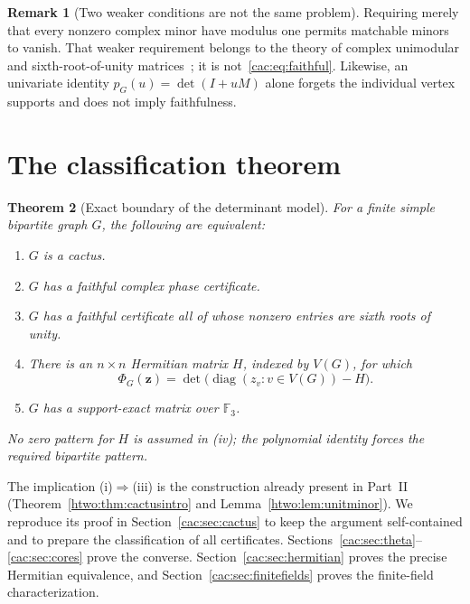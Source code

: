 \documentclass[11pt]{article}
\numberwithin{equation}{section}
\newtheorem{theorem}{Theorem}[section]
\theoremstyle{definition}
\newtheorem{remark}[theorem]{Remark}
\newcommand{\diag}{\operatorname{diag}}
\newcommand{\F}{\mathbb F}
\newcommand{\zv}{\mathbf z}
\begin{document}
\begin{remark}[Two weaker conditions are not the same problem]
Requiring merely that every nonzero complex minor have modulus one permits matchable minors to vanish. That weaker requirement belongs to the theory of complex unimodular and sixth-root-of-unity matrices~\cite{BDZ}; it is not~\eqref{cac:eq:faithful}. Likewise, an univariate identity $p_G(u)=\det(I+uM)$ alone forgets the individual vertex supports and does not imply faithfulness.
\end{remark}

\section{The classification theorem}
\label{cac:sec:main}

\begin{theorem}[Exact boundary of the determinant model]
\label{cac:thm:classification}
For a finite simple bipartite graph $G$, the following are equivalent:
\begin{enumerate}[label=(\roman*)]
\item $G$ is a cactus.
\item $G$ has a faithful complex phase certificate.
\item $G$ has a faithful certificate all of whose nonzero entries are sixth roots of unity.
\item There is an $n\times n$ Hermitian matrix $H$, indexed by $V(G)$, for which
\begin{equation}
 \Phi_G(\zv)=\det\bigl(\diag(z_v:v\in V(G))-H\bigr).
 \label{cac:eq:vertexdet}
\end{equation}
\item $G$ has a support-exact matrix over $\F_3$.
\end{enumerate}
No zero pattern for $H$ is assumed in (iv); the polynomial identity forces the required bipartite pattern.
\end{theorem}

The implication (i)$\Rightarrow$(iii) is the construction already present in Part~II (Theorem~\ref{htwo:thm:cactusintro} and Lemma~\ref{htwo:lem:unitminor}). We reproduce its proof in Section~\ref{cac:sec:cactus} to keep the argument self-contained and to prepare the classification of all certificates. Sections~\ref{cac:sec:theta}--\ref{cac:sec:cores} prove the converse. Section~\ref{cac:sec:hermitian} proves the precise Hermitian equivalence, and Section~\ref{cac:sec:finitefields} proves the finite-field characterization.
\end{document}
